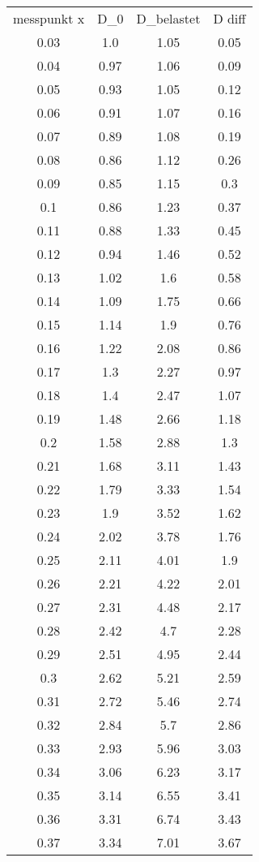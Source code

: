 \begin{table}
\begin{tabular}{cccc}
messpunkt x & D_0 & D_belastet & D diff \\
0.03 & 1.0 & 1.05 & 0.05 \\
0.04 & 0.97 & 1.06 & 0.09 \\
0.05 & 0.93 & 1.05 & 0.12 \\
0.06 & 0.91 & 1.07 & 0.16 \\
0.07 & 0.89 & 1.08 & 0.19 \\
0.08 & 0.86 & 1.12 & 0.26 \\
0.09 & 0.85 & 1.15 & 0.3 \\
0.1 & 0.86 & 1.23 & 0.37 \\
0.11 & 0.88 & 1.33 & 0.45 \\
0.12 & 0.94 & 1.46 & 0.52 \\
0.13 & 1.02 & 1.6 & 0.58 \\
0.14 & 1.09 & 1.75 & 0.66 \\
0.15 & 1.14 & 1.9 & 0.76 \\
0.16 & 1.22 & 2.08 & 0.86 \\
0.17 & 1.3 & 2.27 & 0.97 \\
0.18 & 1.4 & 2.47 & 1.07 \\
0.19 & 1.48 & 2.66 & 1.18 \\
0.2 & 1.58 & 2.88 & 1.3 \\
0.21 & 1.68 & 3.11 & 1.43 \\
0.22 & 1.79 & 3.33 & 1.54 \\
0.23 & 1.9 & 3.52 & 1.62 \\
0.24 & 2.02 & 3.78 & 1.76 \\
0.25 & 2.11 & 4.01 & 1.9 \\
0.26 & 2.21 & 4.22 & 2.01 \\
0.27 & 2.31 & 4.48 & 2.17 \\
0.28 & 2.42 & 4.7 & 2.28 \\
0.29 & 2.51 & 4.95 & 2.44 \\
0.3 & 2.62 & 5.21 & 2.59 \\
0.31 & 2.72 & 5.46 & 2.74 \\
0.32 & 2.84 & 5.7 & 2.86 \\
0.33 & 2.93 & 5.96 & 3.03 \\
0.34 & 3.06 & 6.23 & 3.17 \\
0.35 & 3.14 & 6.55 & 3.41 \\
0.36 & 3.31 & 6.74 & 3.43 \\
0.37 & 3.34 & 7.01 & 3.67 \\

\end{tabular}
\end{table}
